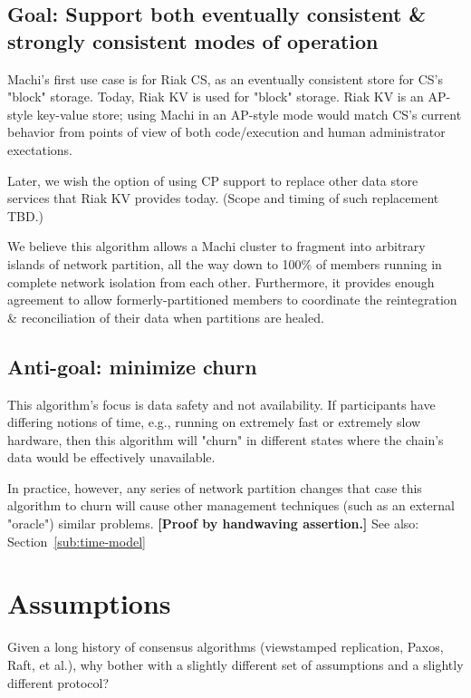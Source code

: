 \documentclass[preprint,10pt]{sigplanconf}
\begin{document}
\subsection{Goal: Support both eventually consistent \& strongly consistent modes of operation}

Machi's first use case is for Riak CS, as an eventually consistent
store for CS's "block" storage.  Today, Riak KV is used for "block"
storage.  Riak KV is an AP-style key-value store; using Machi in an
AP-style mode would match CS's current behavior from points of view of
both code/execution and human administrator exectations.

Later, we wish the option of using CP support to replace other data
store services that Riak KV provides today.  (Scope and timing of such
replacement TBD.)

We believe this algorithm allows a Machi cluster to fragment into
arbitrary islands of network partition, all the way down to 100\% of
members running in complete network isolation from each other.
Furthermore, it provides enough agreement to allow
formerly-partitioned members to coordinate the reintegration \&
reconciliation of their data when partitions are healed.

\subsection{Anti-goal: minimize churn}

This algorithm's focus is data safety and not availability.  If
participants have differing notions of time, e.g., running on
extremely fast or extremely slow hardware, then this algorithm will
"churn" in different states where the chain's data would be
effectively unavailable.

In practice, however, any series of network partition changes that
case this algorithm to churn will cause other management techniques
(such as an external "oracle") similar problems.
{\bf [Proof by handwaving assertion.]}
See also: Section~\ref{sub:time-model}

\section{Assumptions}
\label{sec:assumptions}

Given a long history of consensus algorithms (viewstamped replication,
Paxos, Raft, et al.), why bother with a slightly different set of
assumptions and a slightly different protocol?
\end{document}
